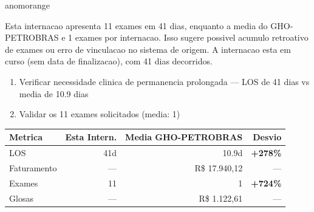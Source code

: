 \documentclass[a4paper,10pt]{article}
\begin{document}
\begin{anomalycard}[Internacao 165070 | GHO-PETROBRAS | ALTO (z=4.56)]{anomorange}
\vspace{2pt}\begin{tcolorbox}[colback=severityred!20,colframe=anomorange,title={\textbf{Interpretacao de Negocio}},fonttitle=\bfseries\small,left=4pt,right=4pt,top=3pt,bottom=3pt]
{\small Esta internacao apresenta 11 exames em 41 dias, enquanto a media do GHO-PETROBRAS e 1 exames por internacao. Isso sugere possivel acumulo retroativo de exames ou erro de vinculacao no sistema de origem. A internacao esta em curso (sem data de finalizacao), com 41 dias decorridos.}
\end{tcolorbox}
\begin{tcolorbox}[colback=severityyellow!30,colframe=anomorange,title={\textbf{Recomendacoes Especificas}},fonttitle=\bfseries\small,left=4pt,right=4pt,top=3pt,bottom=3pt]
\begin{enumerate}[nosep,leftmargin=16pt]
\item {\small Verificar necessidade clinica de permanencia prolongada --- LOS de 41 dias vs media de 10.9 dias}
\item {\small Validar os 11 exames solicitados (media: 1)}
\end{enumerate}
\end{tcolorbox}
\begin{center}\begin{tabular}{l r r r}\toprule\textbf{Metrica} & \textbf{Esta Intern.} & \textbf{Media GHO-PETROBRAS} & \textbf{Desvio} \\\midrule
LOS & 41d & 10.9d & \textcolor{anomred}{\textbf{+278\%}} \\
Faturamento & --- & R\$ 17.940,12 & --- \\
Exames & 11 & 1 & \textcolor{anomred}{\textbf{+724\%}} \\
Glosas & --- & R\$ 1.122,61 & --- \\
\bottomrule\end{tabular}\end{center}


\end{anomalycard}
\end{document}
